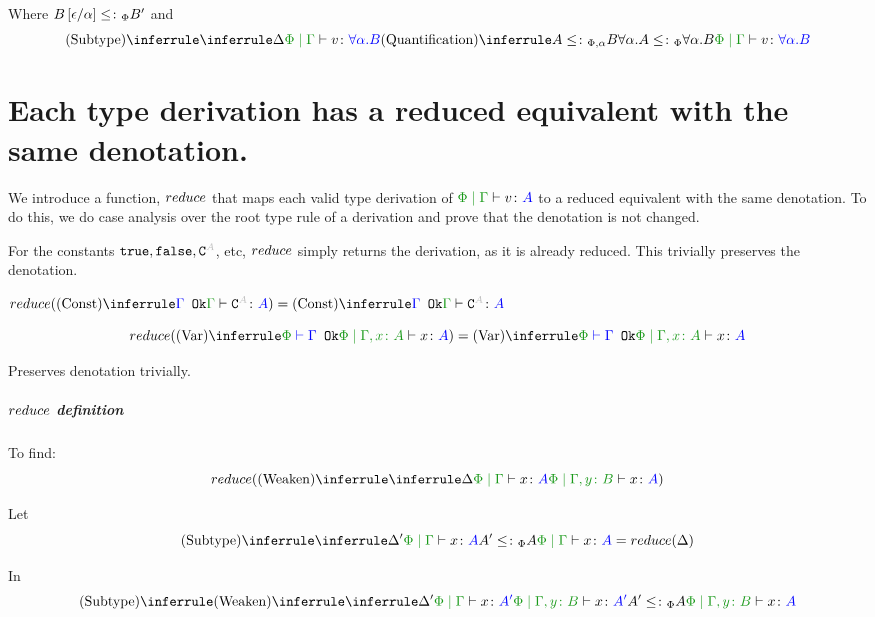 \documentclass{report}
\begin{document}
    Where $B\left[\epsilon / \alpha\right]\leq\colon_\Phi B'$
    and
    \begin{equation}
        \ntreeruleII{Subtype}{
            \treeruleI{\D}{\gpetyperelation{v}{\all{\a}{B}}}}{ \ntreeruleI{Quantification}{A\subtypepa B}{\all{\a}{A}\subtypep\all{\a}{B}}
        }{\gpetyperelation{v}{\all{\a}{B}}}
    \end{equation}


    \section{Each type derivation has a reduced equivalent with the same denotation.}
    We introduce a function, $reduce$ that maps each valid type derivation of $\gpetyperelation{v}{A}$ to a reduced equivalent with the same denotation. To do this, we do case analysis over the root type rule of a derivation and prove that the denotation is not changed.

            For the constants $\t, \f, \const{A}$, etc, $reduce$ simply returns the derivation, as it is already reduced. This trivially preserves the denotation.

            $\reduce(\truleconst) = \truleconst$

            \begin{equation}
                \reduce(\ntreeruleI{Var}{\wellformedok{\P}{\G}}{\etyperelation{\P}{\gax}{x}{A}}) =  \ntreeruleI{Var}{\wellformedok{\P}{\G}}{\etyperelation{\P}{\gax}{x}{A}}
            \end{equation}

            Preserves denotation trivially.

            \subparagraph{$reduce$ definition}
            To find:
            \begin{equation}
                \reduce(\ntreeruleI{Weaken}{\treeruleI{\D}{\gpetyperelation{x}{A}}}{\etyperelation{\P}{\gby}{x}{A}})
            \end{equation}

            Let 
            \begin{equation}\label{WeakenDeltaReduction}
                \ntreeruleII{Subtype}{\treeruleI{\D'}{\gpetyperelation{x}{A}}}{ A'\subtypep A}{\gpetyperelation{x}{A}} = \reduce(\D)
            \end{equation}

            In 
            \begin{equation}
                \ntreeruleII{Subtype}{
                \ntreeruleI{Weaken}{
                    \treeruleI{\D'}{\gpetyperelation{x}{A'}}
                } {
                    \etyperelation{\P}{\gby}{x}{A'}
                }
                }{
                A' \subtypep A
                }{\etyperelation{\P}{\gby}{x}{A}}
            \end{equation}
\end{document}
